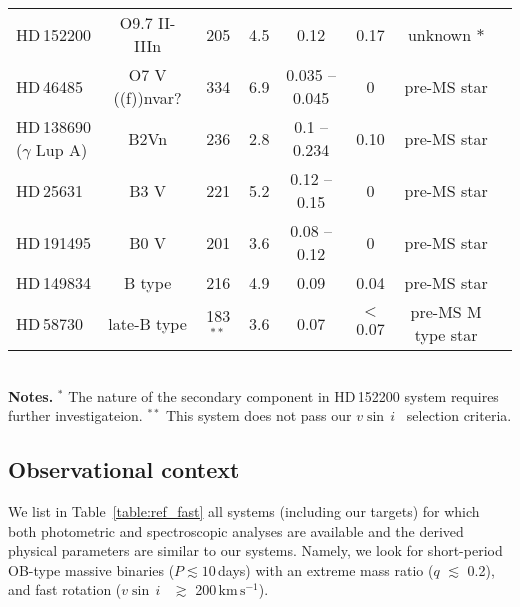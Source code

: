 \documentclass{aa}
\newcommand{\kms}{$\mathrm{km\,s^{-1}}$}
\newcommand{\vsini} {$v\sin\,i$}
\DeclareRobustCommand{\Tabref}[1]{Table~\ref{#1}}
\newcommand{\mr}[1]{\textcolor{green!50!black}{#1}}
\begin{document}
\begin{table*}[!htbp]
{\begin{tabular}{l |c c c c c c c}
HD\,152200        &   O9.7 II-IIIn       &     205        &    4.5     &     0.12             &  0.17     &  unknown $\ast$   &   \citet{Britavskiy_2023}     \\
HD\,46485         &   O7 V ((f))nvar?    &     334        &    6.9     &     0.035 -- 0.045      &  0     &  pre-MS star     &   \citet{Naze_2023_rot}     \\
HD\,138690 ($\gamma$ Lup A)  &   B2Vn     &     236        &    2.8     &     0.1 -- 0.234            &  0.10    &  pre-MS star     &   \citet{Jerzykiewicz_2021}     \\
HD\,25631         &   B3 V    &     221        &    5.2     &     0.12 -- 0.15             &  0     &  pre-MS star     &   \citet{Naze_2023_rot}     \\
HD\,191495         &   B0 V    &     201        &    3.6     &     0.08 -- 0.12             &  0     &  pre-MS star     &   \citet{Naze_2023_rot}     \\
HD\,149834             &   B type     &     216        &    4.9     &     0.09             &  0.04     &  pre-MS star     &   \citet{Stassun_2021}   \\
HD\,58730      &   late-B type   &     183 $^{\ast\ast}$       &    3.6     &     0.07            &  $<$ 0.07     &  pre-MS M type star     &   \citet{Stevens_2020}     \\
\hline
\end{tabular}
\\
{\bf Notes.}  $^{\ast}$ The nature of the secondary component in HD\,152200 system requires further investigateion. $^{\ast\ast}$ This system does not pass our \vsini~ selection criteria. }
\end{table*}
\subsection{Observational context}

We list in \Tabref{table:ref_fast} all systems (including our targets) for which both
  photometric and spectroscopic analyses are available and the derived physical parameters are similar to our
systems. Namely, we look for short-period OB-type massive binaries
($P\lesssim 10$\,days) with an extreme mass ratio ($q$ $\lesssim$ 0.2), and
fast rotation (\vsini~ $\gtrsim$ 200\,\kms).
\end{document}
